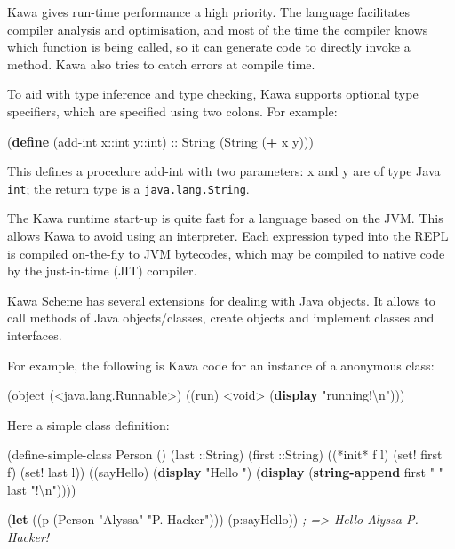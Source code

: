 \documentclass[12pt,a4paper,oneside,openright]{book}
\newenvironment{Shaded}{\begin{snugshade}}{\end{snugshade}}
\newcommand{\KeywordTok}[1]{\textcolor[rgb]{0.13,0.29,0.53}{\textbf{{#1}}}}
\newcommand{\StringTok}[1]{\textcolor[rgb]{0.31,0.60,0.02}{{#1}}}
\newcommand{\CommentTok}[1]{\textcolor[rgb]{0.56,0.35,0.01}{\textit{{#1}}}}
\newcommand{\FunctionTok}[1]{\textcolor[rgb]{0.00,0.00,0.00}{{#1}}}
\newcommand{\NormalTok}[1]{{#1}}
\begin{document}
Kawa gives run-time performance a high priority. The language
facilitates compiler analysis and optimisation, and most of the time the
compiler knows which function is being called, so it can generate code
to directly invoke a method. Kawa also tries to catch errors at compile
time.

To aid with type inference and type checking, Kawa supports optional
type specifiers, which are specified using two colons. For example:

\begin{Shaded}
\begin{Highlighting}[]
    \NormalTok{(}\KeywordTok{define}\FunctionTok{ }\NormalTok{(add-int x::int y::int) :: String}
        \NormalTok{(String (}\KeywordTok{+} \NormalTok{x y)))}
\end{Highlighting}
\end{Shaded}

This defines a procedure add-int with two parameters: x and y are of
type Java \texttt{int}; the return type is a \texttt{java.lang.String}.

The Kawa runtime start-up is quite fast for a language based on the JVM.
This allows Kawa to avoid using an interpreter. Each expression typed
into the REPL is compiled on-the-fly to JVM bytecodes, which may be
compiled to native code by the just-in-time (JIT) compiler.

Kawa Scheme has several extensions for dealing with Java objects. It
allows to call methods of Java objects/classes, create objects and
implement classes and interfaces.

For example, the following is Kawa code for an instance of a anonymous
class:

\begin{Shaded}
\begin{Highlighting}[]
    \NormalTok{(object (<java.lang.Runnable>)}
      \NormalTok{((run) <void>}
       \NormalTok{(}\KeywordTok{display} \StringTok{"running!\textbackslash{}n"}\NormalTok{)))}
\end{Highlighting}
\end{Shaded}

Here a simple class definition:

\begin{Shaded}
\begin{Highlighting}[]
    \NormalTok{(define-simple-class Person ()}
      \NormalTok{(last ::String)}
      \NormalTok{(first ::String)}
      \NormalTok{((*init* f l)}
       \NormalTok{(set! first f)}
       \NormalTok{(set! last l))}
      \NormalTok{((sayHello)}
       \NormalTok{(}\KeywordTok{display} \StringTok{"Hello "}\NormalTok{)}
       \NormalTok{(}\KeywordTok{display} \NormalTok{(}\KeywordTok{string-append} \NormalTok{first}
                               \StringTok{" "}
                               \NormalTok{last}
                               \StringTok{"!\textbackslash{}n"}\NormalTok{))))}

    \NormalTok{(}\KeywordTok{let} \NormalTok{((p (Person }\StringTok{"Alyssa"} \StringTok{"P. Hacker"}\NormalTok{)))}
      \NormalTok{(p:sayHello)) }\CommentTok{; => Hello Alyssa P. Hacker!}
\end{Highlighting}
\end{Shaded}
\end{document}
